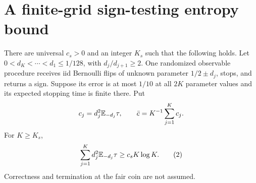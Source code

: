 \section{A finite-grid sign-testing entropy bound}
\begin{lemma}\label{lem:sign}
There are universal $c_s>0$ and an integer $K_s$ such that the following holds.
Let $0<d_K<\cdots<d_1\le1/128$, with $d_j/d_{j+1}\ge2$.
One randomized observable procedure receives iid Bernoulli flips of unknown
parameter $1/2\pm d_j$, stops, and returns a sign. Suppose its error is at most
$1/10$ at all $2K$ parameter values and its expected stopping time is finite
there. Put
\[
 c_j=d_j^2\mathbb E_{-d_j}\tau,\qquad \bar c=K^{-1}\sum_{j=1}^Kc_j.
\]
For $K\ge K_s$,
\[
 \sum_{j=1}^K d_j^2\mathbb E_{-d_j}\tau\ge c_sK\log K.          \tag{2}
\]
Correctness and termination at the fair coin are not assumed.
\end{lemma}
